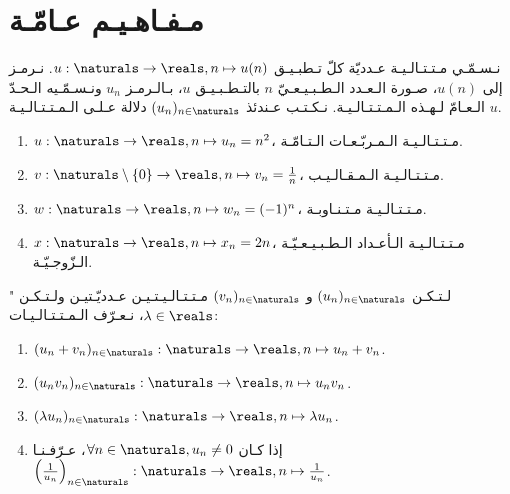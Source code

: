 \section{مـفـاهـيـم عـامّـة}%
\label{sec:sesequences:general-concepts}

\begin{definition}[الـمـتـتـالـيـة]%
    \label{def:sequences:sequence}
    نـسـمّـي مـتـتـالـيـة عـدديّة كلّ تـطبـيـق
    \(u:\naturals \to \reals, n \mapsto u(n)\).
    نـرمـز إلى \(u(n)\)، صـورة الـعـدد الـطـبـيـعـيّ \(n\)
    بالتـطـبـيـق \(u\)، بـالـرمـز \(u_n\)
    ونـسـمّـيه الـحـدّ الـعـامّ لـهـذه الـمـتـتـالـيـة.
    نـكـتـب عـندئذ \((u_n)_{n \in \naturals}\)
    دلالة عـلـى الـمـتـتـالـيـة \(u\).
\end{definition}

\begin{example}%
    \begin{enumerate}%
        \item \(u:\naturals \to \reals, n \mapsto u_n = n^2\)،
              مـتـتـالـيـة الـمـربّـعـات الـتـامّـة.
        \item \(v:\naturals \setminus \{0\} \to \reals, n \mapsto v_n = \frac{1}{n}\)،
              مـتـتـالـيـة الـمـقـالـيـب.
        \item \(w:\naturals \to \reals, n \mapsto w_n = (-1)^n\)،
              مـتـتـالـيـة مـتـنـاوبـة.
        \item \(x:\naturals \to \reals, n \mapsto x_n = 2n\)،
              مـتـتـالـيـة الـأعـداد الـطـبـيـعـيّـة الـزّوجـيّـة.
    \end{enumerate}
\end{example}

\begin{definition}"
    \label{def:sequences:operations}
    لـتـكـن \((u_n)_{n \in \naturals}\) و \((v_n)_{n \in \naturals}\) مـتـتـالـيـتـيـن عـدديّـتيـن
    ولـتـكـن \(\lambda \in \reals\)،
    نـعـرّف الـمـتـتـالـيـات:
    \begin{enumerate}
        \item \((u_n + v_n)_{n \in \naturals}: \naturals \to \reals, n \mapsto u_n + v_n\).
        \item \((u_n v_n)_{n \in \naturals}: \naturals \to \reals, n \mapsto u_n v_n\).
        \item \((\lambda u_n)_{n \in \naturals}: \naturals \to \reals, n \mapsto \lambda u_n\).
        \item إذا كـان \(\forall n \in \naturals, u_n \neq 0\)، عـرّفـنـا
              \(\left(\frac{1}{u_{n}}\right)_{n\in\naturals}: \naturals \to \reals, n \mapsto \frac{1}{u_n}\).
    \end{enumerate}
\end{definition}

